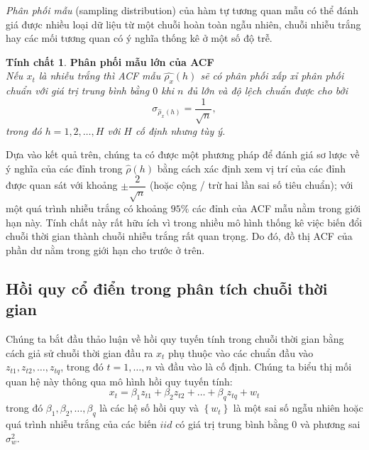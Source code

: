 \documentclass[12pt, a4paper,oneside]{book}
\theoremstyle{definition}
\newtheorem{tc}[theo]{Tính chất}
\begin{document}
\textit{Phân phối mẫu }(sampling distribution) của hàm tự tương quan mẫu có thể đánh giá được nhiều loại dữ liệu từ một chuỗi hoàn toàn ngẫu nhiên, chuỗi nhiễu trắng hay các mối tương quan có ý nghĩa thống kê ở một số độ trễ.

\begin{tc}\cite{1} \textbf{Phân phối mẫu lớn của ACF}\\
	\textit{Nếu $ x_{t}$ là nhiễu trắng thì ACF mẫu $\widehat{\rho_{x}}(h)$ sẽ có phân phối xấp xỉ phân phối chuẩn với giá trị trung bình bằng $0$  khi $n$ đủ lớn và độ lệch chuẩn được cho bởi
		\begin{equation}
		\sigma_{\hat{\rho}_{x}(h)}=\dfrac{1}{\sqrt{n}}, \label{ct1.40}
		\end{equation}
		trong đó $h = 1, 2, \dots, H$ với $H$ cố định nhưng tùy ý.}
\end{tc}
Dựa vào kết quả trên, chúng ta có được một phương pháp để đánh giá sơ lược về ý nghĩa của các đỉnh trong $\widehat{\rho}(h)$ bằng cách xác định xem vị trí của các đỉnh được quan sát với khoảng $\pm\dfrac{2}{\sqrt{n}}$ (hoặc cộng / trừ hai lần sai số tiêu chuẩn); với một quá trình nhiễu trắng có khoảng $95\%$ các đỉnh của ACF mẫu nằm trong giới hạn này. Tính chất này rất hữu ích vì trong nhiều mô hình thống kê việc biến đổi chuỗi thời gian thành chuỗi nhiễu trắng rất quan trọng. Do đó, đồ thị  ACF của phần dư nằm trong giới hạn cho trước ở trên.
\subsection{\label{hqcd}Hồi quy cổ điển trong phân tích chuỗi thời gian}
Chúng ta bắt đầu thảo luận về hồi quy tuyến tính trong chuỗi thời gian bằng cách giả sử chuỗi thời gian đầu ra $x_{t}$ phụ thuộc vào các chuẩn đầu vào $z_{t1}, z_{t2}, \dots, z_{tq}$, trong đó $t=1, \dots, n$ và đầu vào là cố định. Chúng ta biểu thị mối quan hệ này thông qua mô hình hồi quy tuyến tính:
\begin{equation}
x_{t}=\beta_{1}z_{t1} + \beta_{2}z_{t2} + \dots+ \beta_{q}z_{tq} +w_{t} \label{ct1.44}
\end{equation}
trong đó $\beta_{1}, \beta_{2}, \dots, \beta_{q}$ là các hệ số hồi quy và $\left\lbrace w_{t} \right\rbrace$ là một sai số ngẫu nhiên hoặc quá trình nhiễu trắng của các biến $iid$ có giá trị trung bình bằng $0$ và phương sai $\sigma_{w}^{2} $.
\end{document}
